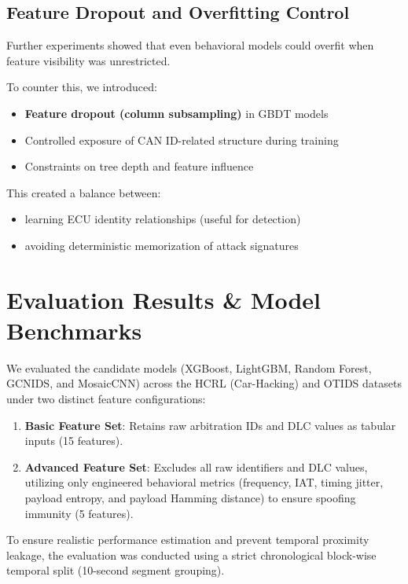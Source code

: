 \documentclass{article}
\begin{document}
\subsection{Feature Dropout and Overfitting Control}
Further experiments showed that even behavioral models could overfit when feature visibility was unrestricted.

To counter this, we introduced:
\begin{itemize}[noitemsep]
    \item \textbf{Feature dropout (column subsampling)} in GBDT models
    \item Controlled exposure of CAN ID-related structure during training
    \item Constraints on tree depth and feature influence
\end{itemize}

This created a balance between:
\begin{itemize}[noitemsep]
    \item learning ECU identity relationships (useful for detection)
    \item avoiding deterministic memorization of attack signatures
\end{itemize}


\section{Evaluation Results \& Model Benchmarks}
We evaluated the candidate models (XGBoost, LightGBM, Random Forest, GCNIDS, and MosaicCNN) across the HCRL (Car-Hacking) and OTIDS datasets under two distinct feature configurations:
\begin{enumerate}
    \item \textbf{Basic Feature Set}: Retains raw arbitration IDs and DLC values as tabular inputs (15 features).
    \item \textbf{Advanced Feature Set}: Excludes all raw identifiers and DLC values, utilizing only engineered behavioral metrics (frequency, IAT, timing jitter, payload entropy, and payload Hamming distance) to ensure spoofing immunity (5 features).
\end{enumerate}

To ensure realistic performance estimation and prevent temporal proximity leakage, the evaluation was conducted using a strict chronological block-wise temporal split (10-second segment grouping).
\end{document}
